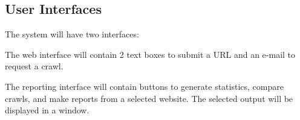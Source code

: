\subsection{User Interfaces}
The system will have two interfaces:

The web interface will contain 2 text boxes to submit a URL and an e-mail to request a crawl.

The reporting interface will contain buttons to generate statistics, compare crawls, and make reports from a selected website.  The selected output will be displayed in a window.
